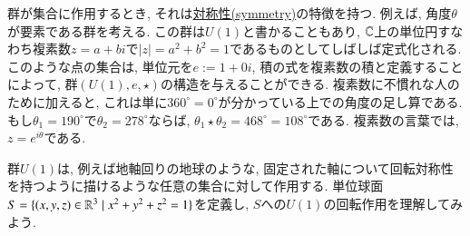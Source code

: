 \begin{example}\label{ex:U(1)}


群が集合に作用するとき, それは\href{http://en.wikipedia.org/wiki/Symmetry}{対称性(symmetry)}の特徴を持つ. 例えば, 角度$\theta$が要素である群を考える. この群は$U(1)$と書かることもあり, ${\mathbb C}$上の単位円すなわち複素数$z=a+bi$で$|z|=a^2+b^2=1$であるものとしてしばしば定式化される. このような点の集合は, 単位元を$e:=1+0i$, 積の式を複素数の積と定義することによって, 群$(U(1),e,\star)$の構造を与えることができる. 複素数に不慣れな人のために加えると, これは単に$360^\circ=0^\circ$が分かっている上での角度の足し算である. もし$\theta_1=190^\circ$で$\theta_2=278^\circ$ならば, $\theta_1\star\theta_2=468^\circ=108^\circ$である. 複素数の言葉では, $z=e^{i\theta}$である.


群$U(1)$は, 例えば地軸回りの地球のような, 固定された軸について回転対称性を持つように描けるような任意の集合に対して作用する. 単位球面$S=\{(x,y,z)\in{\mathbb R}^3{\;|\;}x^2+y^2+z^2=1\}$を定義し, $S$への$U(1)$の回転作用を理解してみよう.



\end{example}
